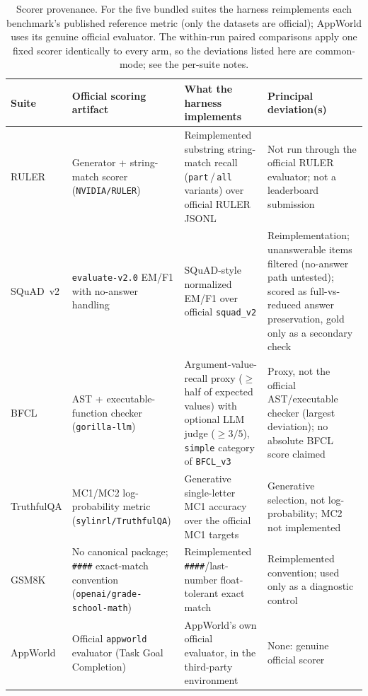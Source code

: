\documentclass[11pt]{article}
\begin{document}
\begin{table}[t]
\centering
\scriptsize
\setlength{\tabcolsep}{4pt}
\renewcommand{\arraystretch}{1.25}
\begin{tabular}{@{}>{\raggedright\arraybackslash}p{1.7cm} >{\raggedright\arraybackslash}p{3.2cm} >{\raggedright\arraybackslash}p{3.9cm} >{\raggedright\arraybackslash}p{4.0cm}@{}}
\toprule
Suite & Official scoring artifact & What the harness implements & Principal deviation(s) \\
\midrule
RULER & Generator + string-match scorer (\texttt{NVIDIA/RULER}) & Reimplemented substring string-match recall (\texttt{part}\,/\,\texttt{all} variants) over official RULER JSONL & Not run through the official RULER evaluator; not a leaderboard submission \\
SQuAD~v2 & \texttt{evaluate-v2.0} EM/F1 with no-answer handling & SQuAD-style normalized EM/F1 over official \texttt{squad\_v2} & Reimplementation; unanswerable items filtered (no-answer path untested); scored as full-vs-reduced answer preservation, gold only as a secondary check \\
BFCL & AST + executable-function checker (\texttt{gorilla-llm}) & Argument-value-recall proxy ($\ge$ half of expected values) with optional LLM judge ($\ge 3/5$), \texttt{simple} category of \texttt{BFCL\_v3} & Proxy, not the official AST/executable checker (largest deviation); no absolute BFCL score claimed \\
TruthfulQA & MC1/MC2 log-probability metric (\texttt{sylinrl/TruthfulQA}) & Generative single-letter MC1 accuracy over the official MC1 targets & Generative selection, not log-probability; MC2 not implemented \\
GSM8K & No canonical package; \texttt{\#\#\#\#} exact-match convention (\texttt{openai/grade-school-math}) & Reimplemented \texttt{\#\#\#\#}/last-number float-tolerant exact match & Reimplemented convention; used only as a diagnostic control \\
AppWorld & Official \texttt{appworld} evaluator (Task Goal Completion) & AppWorld's own official evaluator, in the third-party environment & None: genuine official scorer \\
\bottomrule
\end{tabular}
\caption{Scorer provenance. For the five bundled suites the harness reimplements each benchmark's
published reference metric (only the datasets are official); AppWorld uses its genuine official
evaluator. The within-run paired comparisons apply one fixed scorer identically to every arm, so
the deviations listed here are common-mode; see the per-suite notes.}
\label{tab:scorers}
\end{table}
\end{document}
